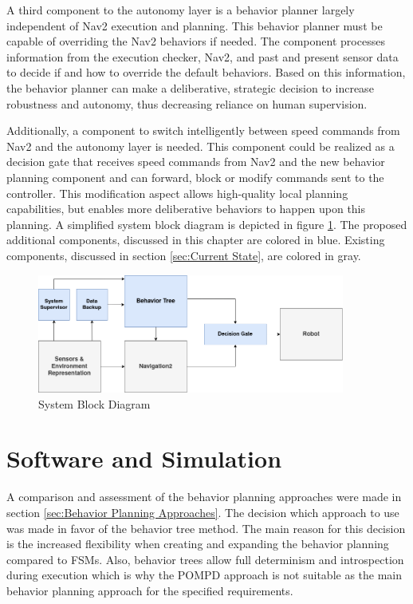 A third component to the autonomy layer is a behavior planner largely independent of Nav2 execution and planning. This behavior planner must be capable of overriding the Nav2 behaviors if needed. The component processes information from the execution checker, Nav2, and past and present sensor data to decide if and how to override the default behaviors. Based on this information, the behavior planner can make a deliberative, strategic decision to increase robustness and autonomy, thus decreasing reliance on human supervision.

Additionally, a component to switch intelligently between speed commands from Nav2 and the autonomy layer is needed. This component could be realized as a decision gate that receives speed commands from Nav2 and the new behavior planning component and can forward, block or modify commands sent to the controller. This modification aspect allows high-quality local planning capabilities, but enables more deliberative behaviors to happen upon this planning. A simplified system block diagram is depicted in figure \ref{fig:block_diagram}. The proposed additional components, discussed in this chapter are colored in blue. Existing components, discussed in section \ref{sec:Current State}, are colored in gray. 

\begin{figure}[ht]
	\centering 
	\includegraphics[width=0.9\textwidth]{images/block_diagram.png}
	\caption{System Block Diagram}
	\label{fig:block_diagram}
\end{figure}


\section{Software and Simulation}

A comparison and assessment of the behavior planning approaches were made in section \ref{sec:Behavior Planning Approaches}. The decision which approach to use was made in favor of the behavior tree method. The main reason for this decision is the increased flexibility when creating and expanding the behavior planning compared to FSMs. Also, behavior trees allow full determinism and introspection during execution which is why the POMPD approach is not suitable as the main behavior planning approach for the specified requirements. 


